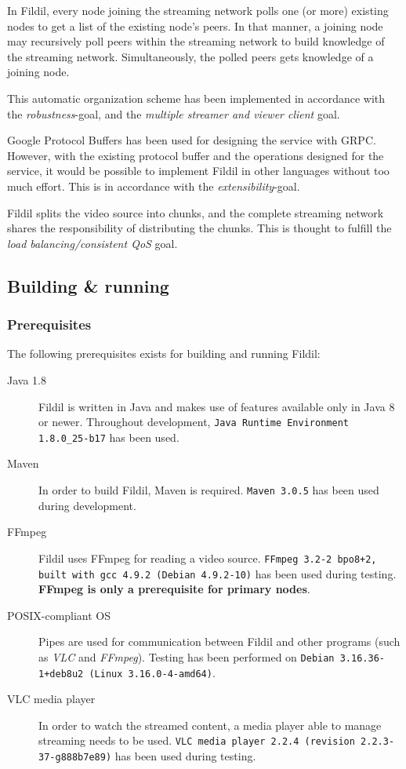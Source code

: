 \documentclass[10pt, a4paper]{article}
\begin{document}
In Fildil, every node joining the streaming network polls one (or more) existing
nodes to get a list of the existing node's peers. In that manner, a joining node
may recursively poll peers within the streaming network to build knowledge of
the streaming network. Simultaneously, the polled peers gets knowledge of a
joining node. 

This automatic organization scheme has been implemented in accordance with the
\emph{robustness}-goal, and the \emph{multiple streamer and viewer client}
goal.

Google Protocol Buffers has been used for designing the service with
GRPC. However, with the existing protocol buffer and the operations designed for
the service, it would be possible to implement Fildil in other languages without
too much effort. This is in accordance with the \emph{extensibility}-goal.

Fildil splits the video source into chunks, and the complete streaming network
shares the responsibility of distributing the chunks. This is thought to fulfill
the \emph{load balancing/consistent QoS} goal.

\subsection{Building \& running}
\label{sec:building-running}

\subsubsection{Prerequisites}

The following prerequisites exists for building and running Fildil:

\begin{description}
\item[Java 1.8] Fildil is written in Java and makes use of features available
  only in Java 8 or newer. Throughout development, \texttt{Java Runtime
    Environment 1.8.0\_25-b17} has been used.
\item[Maven] In order to build Fildil, Maven is required. \texttt{Maven 3.0.5}
  has been used during development.
\item[FFmpeg] Fildil uses FFmpeg for reading a video source. \texttt{FFmpeg
    3.2-2~bpo8+2, built with gcc 4.9.2 (Debian 4.9.2-10)} has been used
  during testing. \textbf{FFmpeg is only a prerequisite for primary nodes}.
\item[POSIX-compliant OS] Pipes are used for communication between Fildil and
  other programs (such as \emph{VLC} and \emph{FFmpeg}). Testing has been
  performed on \texttt{Debian 3.16.36-1+deb8u2 (Linux 3.16.0-4-amd64)}.
\item[VLC media player] In order to watch the streamed content, a media player
  able to manage streaming needs to be used. \texttt{VLC media player 2.2.4
    (revision 2.2.3-37-g888b7e89)} has been used during testing.
\end{description}
\end{document}
